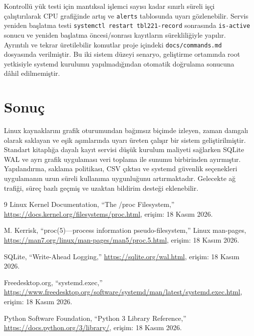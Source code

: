 \documentclass[9pt,a4paper,twocolumn]{extarticle}
\begin{document}
Kontrollü yük testi için mantıksal işlemci sayısı kadar sınırlı süreli işçi çalıştırılarak CPU grafiğinde artış ve \texttt{alerts} tablosunda uyarı gözlenebilir. Servis yeniden başlatma testi \texttt{systemctl restart tbl221-record} sonrasında \texttt{is-active} sonucu ve yeniden başlatma öncesi/sonrası kayıtların sürekliliğiyle yapılır. Ayrıntılı ve tekrar üretilebilir komutlar proje içindeki \texttt{docs/commands.md} dosyasında verilmiştir. Bu iki sistem düzeyi senaryo, geliştirme ortamında root yetkisiyle systemd kurulumu yapılmadığından otomatik doğrulama sonucuna dâhil edilmemiştir.

\section{Sonuç}

Linux kaynaklarını grafik oturumundan bağımsız biçimde izleyen, zaman damgalı olarak saklayan ve eşik aşımlarında uyarı üreten çalışır bir sistem geliştirilmiştir. Standart kitaplığa dayalı kayıt servisi düşük kurulum maliyeti sağlarken SQLite WAL ve ayrı grafik uygulaması veri toplama ile sunumu birbirinden ayırmıştır. Yapılandırma, saklama politikası, CSV çıktısı ve systemd güvenlik seçenekleri uygulamanın uzun süreli kullanıma uygunluğunu artırmaktadır. Gelecekte ağ trafiği, süreç bazlı geçmiş ve uzaktan bildirim desteği eklenebilir.

\begin{thebibliography}{9}
Linux Kernel Documentation, ``The /proc Filesystem,'' \url{https://docs.kernel.org/filesystems/proc.html}, erişim: 18 Kasım 2026.

M. Kerrisk, ``proc(5)---process information pseudo-filesystem,'' Linux man-pages, \url{https://man7.org/linux/man-pages/man5/proc.5.html}, erişim: 18 Kasım 2026.

SQLite, ``Write-Ahead Logging,'' \url{https://sqlite.org/wal.html}, erişim: 18 Kasım 2026.

Freedesktop.org, ``systemd.exec,'' \url{https://www.freedesktop.org/software/systemd/man/latest/systemd.exec.html}, erişim: 18 Kasım 2026.

Python Software Foundation, ``Python 3 Library Reference,'' \url{https://docs.python.org/3/library/}, erişim: 18 Kasım 2026.
\end{thebibliography}
\end{document}
